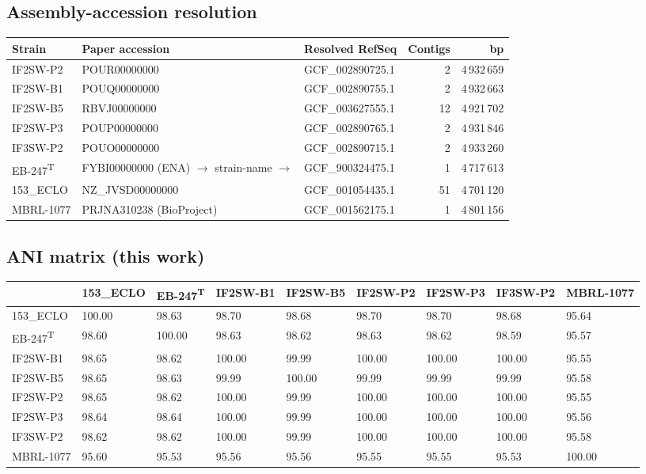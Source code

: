 \documentclass[11pt]{article}
\begin{document}
\subsection{Assembly-accession resolution}
\begin{tabularx}{\linewidth}{lXlrr}
\toprule
Strain & Paper accession & Resolved RefSeq & Contigs & bp \\
\midrule
IF2SW-P2  & POUR00000000 & GCF\_002890725.1 & 2  & 4\,932\,659 \\
IF2SW-B1  & POUQ00000000 & GCF\_002890755.1 & 2  & 4\,932\,663 \\
IF2SW-B5  & RBVJ00000000 & GCF\_003627555.1 & 12 & 4\,921\,702 \\
IF2SW-P3  & POUP00000000 & GCF\_002890765.1 & 2  & 4\,931\,846 \\
IF3SW-P2  & POUO00000000 & GCF\_002890715.1 & 2  & 4\,933\,260 \\
EB-247\textsuperscript{T} & FYBI00000000 (ENA) $\to$ strain-name $\to$ & GCF\_900324475.1 & 1  & 4\,717\,613 \\
153\_ECLO & NZ\_JVSD00000000 & GCF\_001054435.1 & 51 & 4\,701\,120 \\
MBRL-1077 & PRJNA310238 (BioProject) & GCF\_001562175.1 & 1  & 4\,801\,156 \\
\bottomrule
\end{tabularx}

\subsection{ANI matrix (this work)}
\begin{footnotesize}
\begin{tabularx}{\linewidth}{lXXXXXXXX}
\toprule
 & 153\_ECLO & EB-247\textsuperscript{T} & IF2SW-B1 & IF2SW-B5 & IF2SW-P2 & IF2SW-P3 & IF3SW-P2 & MBRL-1077 \\
\midrule
153\_ECLO   & 100.00 & 98.63 & 98.70 & 98.68 & 98.70 & 98.70 & 98.68 & 95.64 \\
EB-247\textsuperscript{T} & 98.60 & 100.00 & 98.63 & 98.62 & 98.63 & 98.62 & 98.59 & 95.57 \\
IF2SW-B1  & 98.65 & 98.62 & 100.00 & 99.99 & 100.00 & 100.00 & 100.00 & 95.55 \\
IF2SW-B5  & 98.65 & 98.63 & 99.99 & 100.00 & 99.99 & 99.99 & 99.99 & 95.58 \\
IF2SW-P2  & 98.65 & 98.62 & 100.00 & 99.99 & 100.00 & 100.00 & 100.00 & 95.55 \\
IF2SW-P3  & 98.64 & 98.64 & 100.00 & 99.99 & 100.00 & 100.00 & 100.00 & 95.56 \\
IF3SW-P2  & 98.62 & 98.62 & 100.00 & 99.99 & 100.00 & 100.00 & 100.00 & 95.58 \\
MBRL-1077 & 95.60 & 95.53 & 95.56 & 95.56 & 95.55 & 95.55 & 95.53 & 100.00 \\
\bottomrule
\end{tabularx}
\end{footnotesize}
\end{document}
